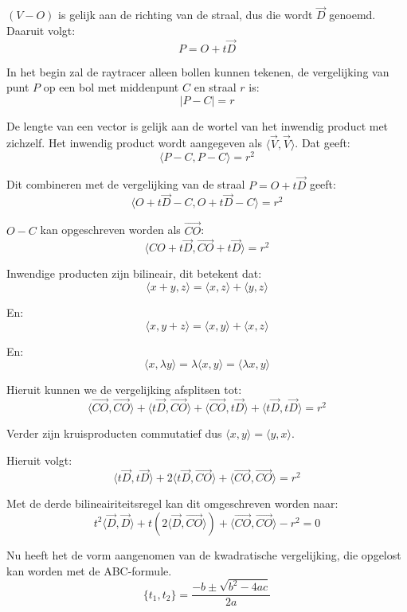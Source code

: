 \documentclass[12pt, a4paper]{article}
\begin{document}
$(V-O)$ is gelijk aan de richting van de straal, dus die wordt $\overrightarrow{D}$ genoemd. Daaruit volgt:
\[P=O+t\overrightarrow{D}\]

In het begin zal de raytracer alleen bollen kunnen tekenen, de vergelijking van punt $P$ op een bol met middenpunt $C$ en straal $r$ is:
\[|P-C|=r\]

De lengte van een vector is gelijk aan de wortel van het inwendig product met zichzelf. Het inwendig product wordt aangegeven als $\langle\overrightarrow{V},\overrightarrow{V} \rangle$. Dat geeft:
\[\langle P-C,P-C\rangle=r^2\]

Dit combineren met de vergelijking van de straal $P=O+t\overrightarrow{D}$ geeft:
\[\langle O+t\overrightarrow{D}-C,O+t\overrightarrow{D}-C\rangle=r^2\]

$O-C$ kan opgeschreven worden als $\overrightarrow{CO}$:
\[\langle{CO}+t\overrightarrow{D},\overrightarrow{CO}+t\overrightarrow{D}\rangle=r^2\]

Inwendige producten zijn bilineair, dit betekent dat:
\[\langle x+y,z\rangle=\langle x,z\rangle+\langle y,z\rangle\]

En:
\[\langle x,y+z\rangle=\langle x,y\rangle+\langle x,z\rangle\]

En:
\[\langle x,\lambda y\rangle=\lambda\langle x,y\rangle=\langle\lambda x,y\rangle\]

Hieruit kunnen we de vergelijking afsplitsen tot:
\[\langle \overrightarrow{CO},\overrightarrow{CO} \rangle + \langle t\overrightarrow{D},\overrightarrow{CO} \rangle + \langle \overrightarrow{CO},t\overrightarrow{D} \rangle + \langle t\overrightarrow{D},t\overrightarrow{D} \rangle = r^2\]

Verder zijn kruisproducten commutatief dus $\langle x,y\rangle=\langle y,x\rangle$.

Hieruit volgt:
\[\langle t\overrightarrow{D},t\overrightarrow{D} \rangle + 2\langle t\overrightarrow{D},\overrightarrow{CO} \rangle + \langle \overrightarrow{CO},\overrightarrow{CO} \rangle = r^2\]

Met de derde bilineairiteitsregel kan dit omgeschreven worden naar:
\[t^2\langle \overrightarrow{D},\overrightarrow{D} \rangle + t\left(2\langle \overrightarrow{D},\overrightarrow{CO} \rangle
\right) + \langle \overrightarrow{CO},\overrightarrow{CO} \rangle - r^2 = 0\]

Nu heeft het de vorm aangenomen van de kwadratische vergelijking, die opgelost kan worden met de ABC-formule.
\[\{t_1, t_2\}=\frac{-b\pm \sqrt{b^2-4ac}}{2a}\]
\end{document}

